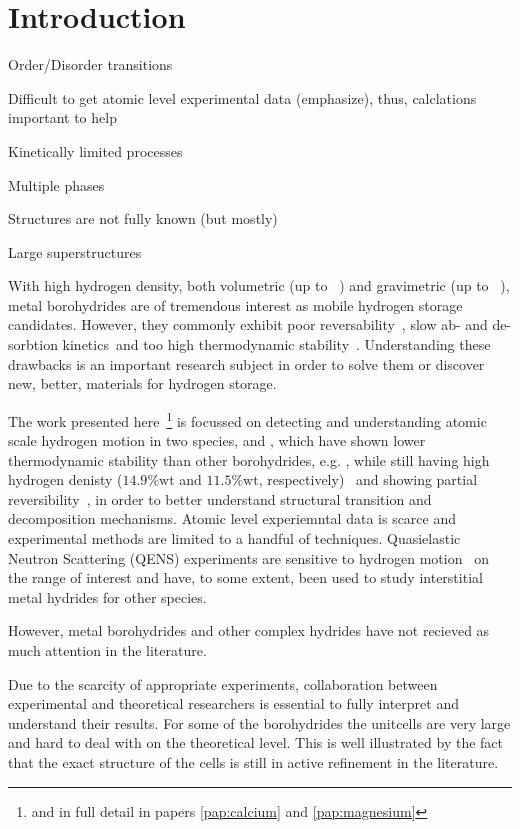 \section{Introduction}
\label{sec:borohydrides-introduction}

\bit
\item Order/Disorder transitions
\item Difficult to get atomic level experimental data (emphasize), thus, calclations important to help
\item Kinetically limited processes
\item Multiple phases
\item Structures are not fully known (but mostly)
\item Large superstructures
\eit

With high hydrogen density, both volumetric (up to \missing{}~\citemiss) and gravimetric (up to \missing{}~\citemiss), metal borohydrides are of tremendous interest as mobile hydrogen storage candidates.
However, they commonly exhibit poor reversability~\citemiss, slow ab- and de-sorbtion kinetics~\citemiss and too high thermodynamic stability~\citemiss.
Understanding these drawbacks is an important research subject in order to solve them or discover new, better, materials for hydrogen storage.

The work presented here~\footnote{and in full detail in papers \ref{pap:calcium} and \ref{pap:magnesium}} is focussed on detecting and understanding atomic scale hydrogen motion in two species,  and , which have shown lower thermodynamic stability than other borohydrides, e.g. , while still having high hydrogen denisty ($14.9\%\text{wt}$ and $11.5\%\text{wt}$, respectively)~\cite{borohydride-stability-2006, calcium-stability-2006} and showing partial reversibility~\citemiss, in order to better understand structural transition and decomposition mechanisms.
Atomic level experiemntal data is scarce and experimental methods are limited to a handful of techniques.
Quasielastic Neutron Scattering (QENS) experiments are sensitive to hydrogen motion~\cite{qens-bee-1988} on the range of interest and have, to some extent, been used to study interstitial metal hydrides for other species.~\citemiss

However, metal borohydrides and other complex hydrides have not recieved as much attention in the literature.
\expand

Due to the scarcity of appropriate experiments, collaboration between experimental and theoretical researchers is essential to fully interpret and understand their results.
For some of the borohydrides the unitcells are very large and hard to deal with on the theoretical level.
This is well illustrated by the fact that the exact structure of the cells is still in active refinement in the literature.~\citemiss
\expand

